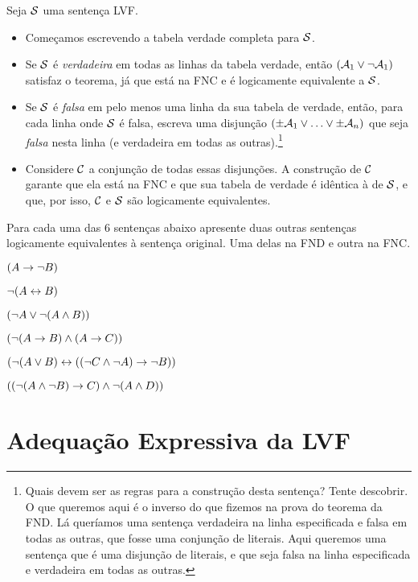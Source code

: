 Seja $\mathcal{S}$ uma sentença LVF.
	\begin{itemize}
       	\item Começamos escrevendo a tabela verdade completa para $\mathcal{S}$.
       	\item Se $\mathcal{S}$ é \emph{verdadeira} em todas as linhas da tabela verdade, então $(\mathcal{A}_1 \vee \neg \mathcal{A}_1)$ satisfaz o teorema, já que está na FNC e é logicamente equivalente a $\mathcal{S}$.
       	\item Se $\mathcal{S}$ é \emph{falsa} em pelo menos uma linha da sua tabela de verdade, então, para cada linha onde $\mathcal{S}$ é falsa, escreva uma disjunção $(\pm\mathcal{A}_1 \vee \ldots \vee \pm\mathcal{A}_n)$ que seja \emph{falsa} nesta linha (e verdadeira em todas as outras).\footnote{
       	Quais devem ser as regras para a construção desta sentença? Tente descobrir. O que queremos aqui é o inverso do que fizemos na prova do teorema da FND.
       	Lá queríamos uma sentença verdadeira na linha especificada e falsa em todas as outras, que fosse uma conjunção de literais.
       	Aqui queremos uma sentença que é uma disjunção de literais, e que seja falsa na linha especificada e verdadeira em todas as outras.}
       	\item Considere $\mathcal{C}$ a conjunção de todas essas disjunções.
       	A construção de $\mathcal{C}$ garante que ela está na FNC e que sua tabela de verdade é idêntica à de $\mathcal{S}$, e que, por isso, $\mathcal{C}$ e $\mathcal{S}$ são logicamente equivalentes.
	\end{itemize}
       
 
\practiceproblems
\problempart
\label{pr.DNF}
Para cada uma das 6 sentenças abaixo apresente duas outras sentenças logicamente equivalentes à sentença original.
Uma delas na FND e outra na FNC.
	\begin{earg}
		\item $(A \rightarrow \neg B)$
		\item $\neg (A \leftrightarrow B)$
		\item $(\neg A \vee \neg (A \wedge B))$
		\item $(\neg (A \rightarrow B ) \wedge (A \rightarrow C))$
		\item $(\neg (A \vee B) \leftrightarrow ((\neg C \wedge \neg A) \rightarrow \neg B))$
		\item $((\neg (A \wedge \neg B) \rightarrow C) \wedge \neg (A \wedge D))$
	\end{earg}

        
\section{Adequação Expressiva da LVF}  


